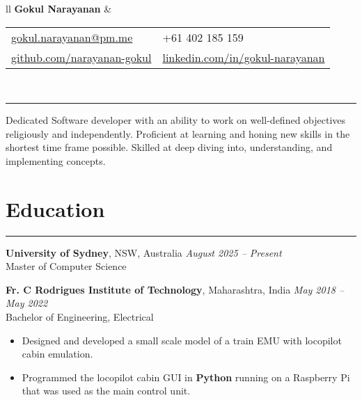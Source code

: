 \documentclass[11pt]{article}
\begin{document}
\begin{tabularx}{\textwidth}{ll}
	{\LARGE \textbf{Gokul Narayanan}} &
	\begin{tabular}{@{}ll}
		\href{mailto:gokul.narayanan@pm.me}{gokul.narayanan@pm.me}
		& +61 402 185 159 \\
		\href{https://github.com/narayanan-gokul}
		{github.com/narayanan-gokul} &
		\href{https://www.linkedin.com/in/gokul-narayanan-5a7681210/}
		{linkedin.com/in/gokul-narayanan} \\
	\end{tabular} \\
\end{tabularx}

\vspace{0.5em}
\rule{\textwidth}{2pt}

Dedicated Software developer with an ability to work on well-defined objectives
religiously and independently. Proficient at learning and honing new skills in
the shortest time frame possible. Skilled at deep diving into, understanding,
and implementing concepts.

\vspace{-0.5\baselineskip}
\section*{Education}
\hrule

\textbf{University of Sydney}, NSW, Australia \hfill
\textit{August 2025 -- Present} \\
Master of Computer Science \\

\vspace{-1\baselineskip}

\textbf{Fr. C Rodrigues Institute of Technology}, Maharashtra, India
\hfill \textit{May 2018 -- May 2022} \\
Bachelor of Engineering, Electrical \\
\vspace{-1.5\baselineskip}
\begin{itemize}[topsep=0pt, itemsep=0pt, partopsep=0pt, label=--]
	\item Designed and developed a small scale model of a train EMU with
		locopilot cabin emulation.
	\item Programmed the locopilot cabin GUI in \textbf{Python} running on
		a Raspberry Pi that was used as the main control unit.
\end{itemize}

\vspace{-0.5\baselineskip}
\end{document}
